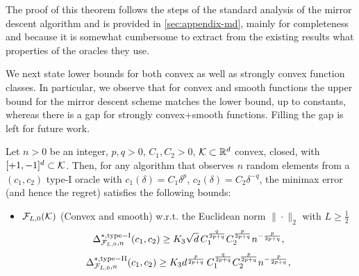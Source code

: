 The proof of this theorem follows the steps of the standard analysis of the mirror descent algorithm
 and is provided in \cref{sec:appendix-md}, mainly for completeness 
 and because it is somewhat cumbersome to extract from the existing results what properties of the oracles they use.

We next state lower bounds for both convex as well as strongly convex function classes. In particular, we observe that for convex and smooth functions the upper bound for the mirror descent scheme matches the lower bound, up to constants, whereas there is a gap for strongly convex+smooth functions.
Filling the gap is left for future work.
\begin{theorem}
\label{thm:lb-convex}
Let $n>0$ be an integer, $p,q>0$, $C_1,C_2>0$, 
$\mathcal{K}\subset \mathbb{R}^d$ convex, closed, with  $[+1,-1]^d\subset \mathcal{K}$.
Then, for any algorithm that observes $n$ random elements from a $(c_1,c_2)$ type-I oracle 
 with $c_1(\delta) = C_1 \delta^p$, $c_2(\delta) = C_2 \delta^{-q}$,
 the minimax error (and hence the regret) satisfies the following bounds:
 \begin{itemize}
 \item
${\mathcal{F}_{L,0}(\mathcal{K})}$ (Convex and smooth) w.r.t. the Euclidean norm $\|\cdot\|_2$ with $L\ge \frac12$
\[
 \Delta_{\F_{L,0},n}^{*, \mathrm{type-I}}(c_1,c_2) \ge K_3\sqrt{d} \, C_1^{\frac{q}{2p+q}} C_2^{\frac{p}{2p+q}} n^{-\frac{p}{2p+q}}, %
\]
\[
 \Delta_{\F_{L,0},n}^{*, \mathrm{type-II}}(c_1,c_2) \ge K_3d^{\frac{p}{2p+q}} \, C_1^{\frac{q}{2p+q}} C_2^{\frac{p}{2p+q}} n^{-\frac{p}{2p+q}}, %
\]

\end{itemize}
\end{theorem}
